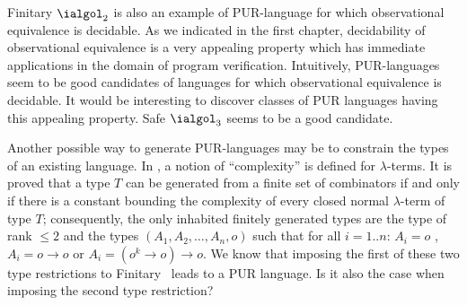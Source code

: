 Finitary $\ialgol_2$ is also an example of PUR-language for which
observational equivalence is decidable. As we indicated in the first
chapter, decidability of observational equivalence is a very
appealing property which has immediate applications in the domain of
program verification. Intuitively, PUR-languages seem to be good
candidates of languages for which observational equivalence is decidable. It would be interesting to discover classes of PUR
languages having this appealing property. Safe $\ialgol_3$ seems to be a good candidate.

Another possible way to generate PUR-languages may be to constrain
the types of an existing language. In \cite{DBLP:conf/tlca/Joly01},
a notion of ``complexity'' is defined for $\lambda$-terms. It is
proved that a type $T$ can be generated from a finite set of
combinators if and only if there is a constant bounding the
complexity of every closed normal $\lambda$-term of type $T$;
consequently, the only inhabited finitely generated types are the
type of rank $\leq 2$ and the types $(A_1, A_2, \ldots, A_n, o)$
such that for all $i = 1..n$: $A_i = o$ , $A_i = o \rightarrow o$ or
$A_i = (o^k \rightarrow o) \rightarrow o$. We know that imposing the
first of these two type restrictions to Finitary \ialgol\ leads to a
PUR language. Is it also the case when imposing the second type
restriction?



    
    

         {\protect{}}

